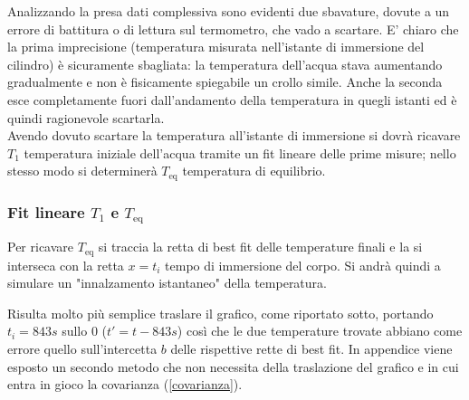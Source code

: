 \documentclass{article}
\begin{document}
\begin{center}
\begin{figure}[H]
		\end{figure}
	\end{center}
	
	Analizzando la presa dati complessiva sono evidenti due sbavature, dovute a un errore di battitura o di lettura sul termometro, che vado a scartare. E' chiaro che la prima imprecisione (temperatura misurata nell'istante di immersione del cilindro) è sicuramente sbagliata: la temperatura dell'acqua stava aumentando gradualmente e non è fisicamente spiegabile un crollo simile. Anche la seconda esce completamente fuori dall'andamento della temperatura in quegli istanti ed è quindi ragionevole scartarla. \\
	
	\noindent
	Avendo dovuto scartare la temperatura all'istante di immersione si dovrà ricavare \(T_{1}\) temperatura iniziale dell'acqua tramite un fit lineare delle prime misure; nello stesso modo si determinerà \(T_{\text{eq}}\) temperatura di equilibrio.
	
	\subsubsection{Fit lineare \(T_{1}\) e \(T_{\text{eq}}\)}
	Per ricavare \(T_{\text{eq}}\) si traccia  la retta di best fit delle temperature finali e la si interseca con la retta \(x=t_{i}\) tempo di immersione del corpo. Si andrà quindi a simulare un "innalzamento istantaneo" della temperatura. 
	
	Risulta molto più semplice traslare il grafico, come riportato sotto, portando \(t_{i} = 843 s\) sullo \(0\) (\(t' = t - 843s\)) così che le due temperature trovate abbiano come errore quello sull'intercetta \(b\) delle rispettive rette di best fit. In appendice viene esposto un secondo metodo che non necessita della traslazione del grafico e in cui entra in gioco la covarianza (\ref{covarianza}). \\
	
\end{document}

